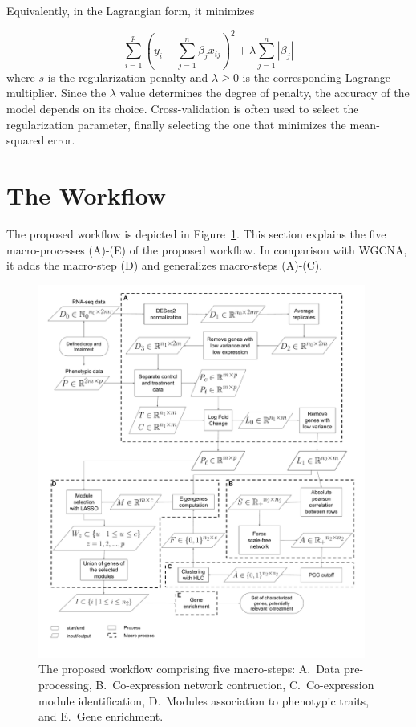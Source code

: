 \documentclass{bmcart}
\newcommand{\abs}[1]{\left\vert#1\right\vert}
\begin{document}
Equivalently, in the Lagrangian form, it minimizes

\begin{equation}
  \sum_{i=1}^{p}{\left( y_i-\sum_{j=1}^n{\beta_j x_{ij}}\right)^2} +
  \lambda \sum_{j=1}^n\abs{\beta_j}
\end{equation}
%
where $s$ is the regularization penalty and $\lambda \geq 0$ is the
corresponding Lagrange multiplier. Since the $\lambda$ value
determines the degree of penalty, the accuracy of the model depends on
its choice. Cross-validation is often used to select the
regularization parameter, finally selecting the one that minimizes the
mean-squared error.

\section*{The Workflow}
\label{sec.framework}

The proposed workflow is depicted in
Figure~\ref{fig:flow_chart}. This section explains the five
macro-processes (A)-(E) of the proposed workflow. In comparison with
WGCNA, it adds the macro-step (D) and generalizes macro-steps (A)-(C).
\vspace{0.5cm}

\begin{figure}[htbp]
  \centering
    \includegraphics[clip,width=0.96\textwidth]{figures/figure1.pdf}
  \caption[The proposed workflow comprising five macro-steps]%
  {The proposed workflow comprising five macro-steps:
    A.~Data pre-processing, B.~Co-expression network
    contruction, C.~Co-expression module identification,
    D.~Modules association to phenotypic traits, and
    E.~Gene enrichment.}
  \label{fig:flow_chart}
\end{figure}
\end{document}
